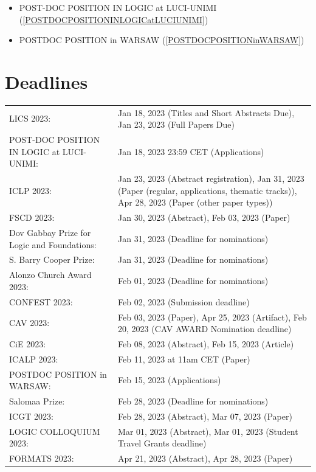 \documentclass[prodmode,acmtecs]{acmsmall} %
\begin{document}
\begin{itemize}
\begin{itemize}\item POST-DOC POSITION IN LOGIC at LUCI-UNIMI (\cref{POSTDOCPOSITIONINLOGICatLUCIUNIMI})
\item POSTDOC POSITION in WARSAW (\cref{POSTDOCPOSITIONinWARSAW})
\end{itemize} 
\end{itemize}\section{Deadlines}\label{deadlines}\begin{tabulary}{\linewidth}{LL}LICS 2023:  & Jan 18, 2023 (Titles and Short Abstracts Due), Jan 23, 2023 (Full Papers Due) \\
POST-DOC POSITION IN LOGIC at LUCI-UNIMI:  & Jan 18, 2023 23:59 CET (Applications) \\
ICLP 2023:  & Jan 23, 2023 (Abstract registration), Jan 31, 2023 (Paper (regular, applications, thematic tracks)), Apr 28, 2023 (Paper (other paper types)) \\
FSCD 2023:  & Jan 30, 2023 (Abstract), Feb 03, 2023 (Paper) \\
Dov Gabbay Prize for Logic and Foundations:  & Jan 31, 2023 (Deadline for nominations) \\
S. Barry Cooper Prize:  & Jan 31, 2023 (Deadline for nominations) \\
Alonzo Church Award 2023:  & Feb 01, 2023 (Deadline for nominations) \\
CONFEST 2023:  & Feb 02, 2023 (Submission deadline) \\
CAV 2023:  & Feb 03, 2023 (Paper), Apr 25, 2023 (Artifact), Feb 20, 2023 (CAV AWARD Nomination deadline) \\
CiE 2023:  & Feb 08, 2023 (Abstract), Feb 15, 2023 (Article) \\
ICALP 2023:  & Feb 11, 2023 at 11am CET (Paper) \\
POSTDOC POSITION in WARSAW:  & Feb 15, 2023 (Applications) \\
Salomaa Prize:  & Feb 28, 2023 (Deadline for nominations) \\
ICGT 2023:  & Feb 28, 2023 (Abstract), Mar 07, 2023 (Paper) \\
LOGIC COLLOQUIUM 2023:  & Mar 01, 2023 (Abstract), Mar 01, 2023 (Student Travel Grants deadline) \\
FORMATS 2023:  & Apr 21, 2023 (Abstract), Apr 28, 2023 (Paper) \\
\end{tabulary}
\end{document}
